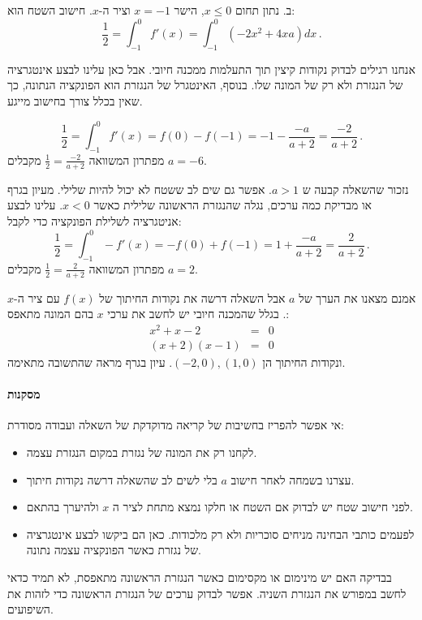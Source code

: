 \documentclass[12pt,a4paper]{article}
\begin{document}
\bigskip

ב. נתון תחום 
$x\leq 0$,
הישר
$x=-1$
וציר ה-$x$. חישוב השטח הוא:
\[
\frac{1}{2} = \int_{-1}^{0} f'(x) = \int_{-1}^{0} (-2x^2 + 4xa) dx\,.
\]

\textbf{}
אנחנו רגילים לבדוק נקודות קיצין תוך התעלמות ממכנה חיובי. אבל כאן עלינו לבצע אינטגרציה של הנגזרת ולא רק של המונה שלו. בנוסף, האינטגרל של הנגזרת הוא הפונקציה הנתונה, כך שאין בכלל צורך בחישוב מייגע. 

\[
\frac{1}{2} = \int_{-1}^{0} f'(x) = f(0) - f(-1) = -1 - \frac{-a}{a+2} = \frac{-2}{a+2}\,.
\]
מפתרון המשוואה
$\frac{1}{2}=\frac{-2}{a+2}$
מקבלים
$a=-6$.

\medskip

\textbf{}
נזכור שהשאלה קבעה ש
$a>1$.
אפשר גם שים לב ששטח לא יכול להיות שלילי. מעיון בגרף או מבדיקת כמה ערכים, נגלה שהנגזרת הראשונה שלילית כאשר 
$x<0$.
עלינו לבצע אניטגרציה לשלילת הפונקציה כדי לקבל:
\[
\frac{1}{2}=\int_{-1}^{0} -f'(x) = -f(0) + f(-1) = 1 + \frac{-a}{a+2} = \frac{2}{a+2}\,.
\]
מפתרון המשוואה
$\frac{1}{2}=\frac{2}{a+2}$
מקבלים
$a=2$.

\medskip

אמנם מצאנו את הערך של
$a$
אבל השאלה דרשה את נקודות החיתוך של 
$f(x)$
עם ציר ה-$x$. בגלל שהמכנה חיובי יש לחשב את ערכי $x$ בהם המונה מתאפס:
\begin{eqnarray*}
x^2+x-2 &=& 0\\
(x+2)(x-1) &=& 0
\end{eqnarray*}
ונקודות החיתוך הן 
$(-2,0), (1,0)$.
עיון בגרף מראה שהתשובה מתאימה.

\paragraph{מסקנות}

אי אפשר להפריז בחשיבות של קריאה מדוקדקת של השאלה ועבודה מסודרת:

\begin{itemize}
\item לקחנו רק את המונה של נגזרת במקום הנגזרת עצמה.
\item עצרנו בשמחה לאחר חישוב
$a$
בלי לשים לב שהשאלה דרשה נקודות חיתוך.
\item לפני חישוב שטח יש לבדוק אם השטח או חלקו נמצא מתחת לציר ה
$x$
ולהיערך בהתאם.
\item
לפעמים כותבי הבחינה מניחים סוכריות ולא רק מלכודות. כאן הם ביקשו לבצע אינטגרציה של נגזרת כאשר הפונקציה עצמה נתונה.
\end{itemize}

בבדיקה האם יש מינימום או מקסימום כאשר הנגזרת הראשונה מתאפסת, לא תמיד כדאי לחשב במפורש את הנגזרת השניה. אפשר לבדוק ערכים של הנגזרת הראשונה כדי לזהות את השיפועים.
\end{document}

